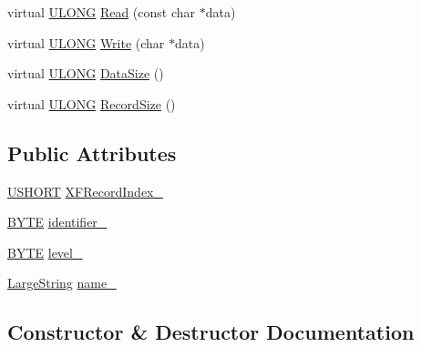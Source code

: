 \begin{DoxyCompactItemize}
\item 
virtual \hyperlink{_basic_excel_8hpp_abe09d1bea023be6a07cbadde8e955435}{U\+L\+O\+N\+G} \hyperlink{struct_y_excel_1_1_workbook_1_1_style_a3200e543cc86076dc7baf9820240c026}{Read} (const char $\ast$data)
\item 
virtual \hyperlink{_basic_excel_8hpp_abe09d1bea023be6a07cbadde8e955435}{U\+L\+O\+N\+G} \hyperlink{struct_y_excel_1_1_workbook_1_1_style_a43422b4d2ad8b3a7d5df218f21816a60}{Write} (char $\ast$data)
\item 
virtual \hyperlink{_basic_excel_8hpp_abe09d1bea023be6a07cbadde8e955435}{U\+L\+O\+N\+G} \hyperlink{struct_y_excel_1_1_workbook_1_1_style_aa05ac567a1a3090cc4ab78a89abc2ca4}{Data\+Size} ()
\item 
virtual \hyperlink{_basic_excel_8hpp_abe09d1bea023be6a07cbadde8e955435}{U\+L\+O\+N\+G} \hyperlink{struct_y_excel_1_1_workbook_1_1_style_a5f79d0c27333de0d0a1b93b75b0d3d22}{Record\+Size} ()
\end{DoxyCompactItemize}
\subsection*{Public Attributes}
\begin{DoxyCompactItemize}
\item 
\hyperlink{_basic_excel_8hpp_a5850d5316caf7f4cedd742fdf8cd7c02}{U\+S\+H\+O\+R\+T} \hyperlink{struct_y_excel_1_1_workbook_1_1_style_a655562c17f5dabc7cd5303aa9c3e0485}{X\+F\+Record\+Index\+\_\+}
\item 
\hyperlink{_basic_excel_8hpp_a4ae1dab0fb4b072a66584546209e7d58}{B\+Y\+T\+E} \hyperlink{struct_y_excel_1_1_workbook_1_1_style_abc0e0fa6c8a7165c2f8b486301caa296}{identifier\+\_\+}
\item 
\hyperlink{_basic_excel_8hpp_a4ae1dab0fb4b072a66584546209e7d58}{B\+Y\+T\+E} \hyperlink{struct_y_excel_1_1_workbook_1_1_style_a31a9b3714cd73d4fb5671457d306d213}{level\+\_\+}
\item 
\hyperlink{struct_y_excel_1_1_large_string}{Large\+String} \hyperlink{struct_y_excel_1_1_workbook_1_1_style_a8e52f27abe416c51e6c6afc6c8381a4e}{name\+\_\+}
\end{DoxyCompactItemize}


\subsection{Constructor \& Destructor Documentation}
\hypertarget{struct_y_excel_1_1_workbook_1_1_style_a5bb7c4581a1fa80a1e72ad20bdcc9b6a}{}
